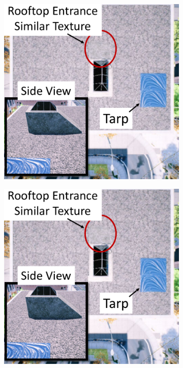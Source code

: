 \begin{figure}[ht]
 \centering
  \begin{subfigure}{.25\columnwidth}
    \centering\includegraphics[page=1, width=.99\columnwidth]{chapter_6_landingsim/figs/CompareAlgs_Case1.pdf}
    \caption{\label{fig:ch6_case1_a}}
  \end{subfigure}
  \begin{subfigure}{.25\columnwidth}
    \centering\includegraphics[page=3, width=.99\columnwidth]{chapter_6_landingsim/figs/CompareAlgs_Case1.pdf}
    \caption{\label{fig:ch6_case1_c}}
  \end{subfigure}
 

\end{figure}
